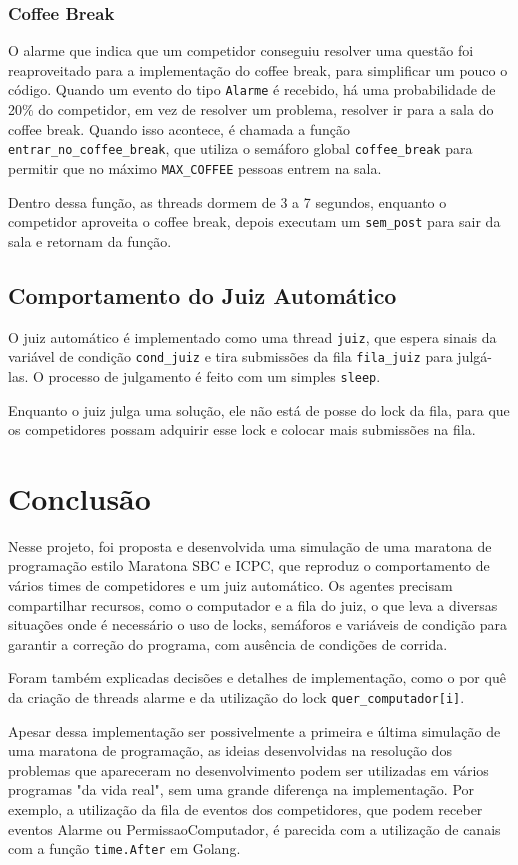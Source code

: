 \documentclass[11pt]{article}
\newcommand{\code}{\lstinline[mathescape=true]}
\begin{document}
	\subsubsection{Coffee Break}
	O alarme que indica que um competidor conseguiu resolver uma questão foi reaproveitado para a
	implementação do coffee break, para simplificar um pouco o código. Quando um evento do tipo
	\code{Alarme} é recebido, há uma probabilidade de 20\% do competidor, em vez de resolver um problema,
	resolver ir para a sala do coffee break. Quando isso acontece, é chamada a função
	\code{entrar_no_coffee_break}, que utiliza o semáforo global \code{coffee_break} para permitir que no
	máximo \code{MAX_COFFEE} pessoas entrem na sala.

	Dentro dessa função, as threads dormem de 3 a 7 segundos, enquanto o competidor aproveita o coffee
	break, depois executam um \code{sem_post} para sair da sala e retornam da função.


	\subsection{Comportamento do Juiz Automático}
	O juiz automático é implementado como uma thread \code{juiz}, que espera sinais da variável de
	condição \code{cond_juiz} e tira submissões da fila \code{fila_juiz} para julgá-las. O processo de
	julgamento é feito com um simples \code{sleep}.

	Enquanto o juiz julga uma solução, ele não está de posse do lock da fila, para que os competidores
	possam adquirir esse lock e colocar mais submissões na fila.


	\section{Conclusão}
	Nesse projeto, foi proposta e desenvolvida uma simulação de uma maratona de programação estilo
	Maratona SBC e ICPC, que reproduz o comportamento de vários times de competidores e um juiz
	automático. Os agentes precisam compartilhar recursos, como o computador e a fila do juiz, o que leva
	a diversas situações onde é necessário o uso de locks, semáforos e variáveis de condição para
	garantir a correção do programa, com ausência de condições de corrida.

	Foram também explicadas decisões e detalhes de implementação, como o por quê da criação de threads
	alarme e da utilização do lock \code{quer_computador[i]}.

	Apesar dessa implementação ser possivelmente a primeira e última simulação de uma maratona de
	programação, as ideias desenvolvidas na resolução dos problemas que apareceram no desenvolvimento
	podem ser utilizadas em vários programas "da vida real", sem uma grande diferença na implementação.
	Por exemplo, a utilização da fila de eventos dos competidores, que podem receber eventos Alarme ou
	PermissaoComputador, é parecida com a utilização de canais com a função \code{time.After} em
	Golang\cite{golang}.



	\medskip
	\printbibliography


	
\end{document}
